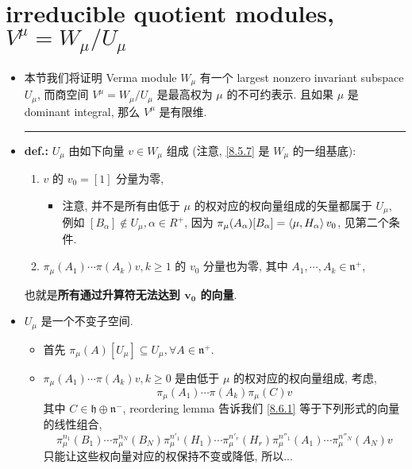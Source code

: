\section{irreducible quotient modules, \texorpdfstring{$V^\mu = W_\mu / U_\mu$}{V\_mu = W\_mu / U\_mu}}
\begin{itemize}
	\item 本节我们将证明 Verma module $W_\mu$ 有一个 largest nonzero invariant subspace $U_\mu$, 而商空间 $V^\mu = W_\mu / U_\mu$ 是最高权为 $\mu$ 的不可约表示. 且如果 $\mu$ 是 dominant integral, 那么 $V^\mu$ 是有限维.
	
	\noindent\rule[0.5ex]{\linewidth}{0.5pt} %
	
	\item \textbf{def.:} $U_\mu$ 由如下向量 $v \in W_\mu$ 组成 (注意, \eqref{8.5.7} 是 $W_\mu$ 的一组基底):
	\begin{enumerate}
		\item $v$ 的 $v_0 = [1]$ 分量为零,
		\begin{itemize}
			\item 注意, 并不是所有由低于 $\mu$ 的权对应的权向量组成的矢量都属于 $U_\mu$, 例如 $[B_\alpha] \notin U_\mu, \alpha \in R^+$, 因为 $\pi_\mu(A_\alpha) [B_\alpha] = \braket{\mu, H_\alpha} v_0$, 见第二个条件.
		\end{itemize}
		
		\item $\pi_\mu(A_1) \cdots \pi(A_k) v, k \geq 1$ 的 $v_0$ 分量也为零, 其中 $A_1, \cdots, A_k \in \mathfrak{n}^+$,
	\end{enumerate}
	也就是\textbf{所有通过升算符无法达到 $\boldsymbol{v_0}$ 的向量}.
	
	\item $U_\mu$ 是一个不变子空间.
	
	\begin{tcolorbox}[title=proof:]
		\begin{itemize}
			\item 首先 $\pi_\mu(A)[U_\mu] \subseteq U_\mu, \forall A \in \mathfrak{n}^+$.
			
			\item $\pi_\mu(A_1) \cdots \pi(A_k) v, k \geq 0$ 是由低于 $\mu$ 的权对应的权向量组成, 考虑,
			\begin{equation} \label{8.6.1}
				\pi_\mu(A_1) \cdots \pi(A_k) \pi_\mu(C) v
			\end{equation}
			其中 $C \in \mathfrak{h} \oplus \mathfrak{n}^-$, reordering lemma 告诉我们 \eqref{8.6.1} 等于下列形式的向量的线性组合, 
			\begin{equation}
				\pi_\mu^{n_1}(B_1) \cdots \pi_\mu^{n_N}(B_N) \pi_\mu^{n'_1}(H_1) \cdots \pi_\mu^{n'_r}(H_r) \pi_\mu^{n''_1}(A_1) \cdots \pi_\mu^{n''_N}(A_N) v
			\end{equation}
			只能让这些权向量对应的权保持不变或降低, 所以...
		\end{itemize}
	\end{tcolorbox}
	

\end{itemize}
